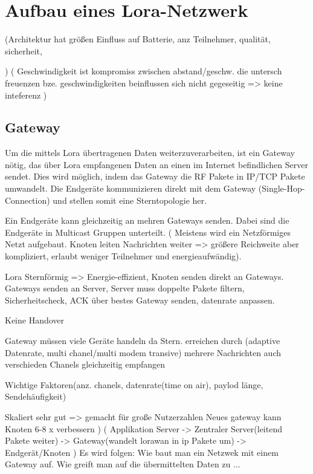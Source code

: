 \documentclass[a4paper,12pt]{article}
\begin{document}
    \section{Aufbau eines Lora-Netzwerk}
    \cite{WhatIsLoRa}(Architektur hat größen Einfluss auf Batterie, anz Teilnehmer, qualität, sicherheit,
    
    )
    \cite{LoRaSpec}(
        Geschwindigkeit ist kompromiss zwischen abstand/geschw. die untersch freuenzen bze. geschwindigkeiten beinflussen sich nicht gegeseitig => keine inteferenz
    )
    \subsection{Gateway}
    Um die mittels Lora übertragenen Daten weiterzuverarbeiten, ist ein Gateway nötig, das über Lora empfangenen Daten an einen im Internet befindlichen Server sendet. Dies wird möglich, indem das Gateway die RF Pakete in IP/TCP Pakete umwandelt.
    Die Endgeräte kommunizieren direkt mit dem Gateway (Single-Hop-Connection) und stellen somit eine Sterntopologie her.

    Ein Endgeräte kann gleichzeitig an mehren Gateways senden. Dabei sind die Endgeräte in Multicast Gruppen unterteilt.
        \cite{TheThing}
        \cite{WhatIsLoRa}(
            Meistens wird ein Netzförmiges Netzt aufgebaut. Knoten leiten Nachrichten weiter => größere Reichweite aber kompliziert, erlaubt weniger Teilnehmer und energieaufwändig). 

            Lora Sternförmig => Energie-effizient, Knoten senden direkt an Gateways. Gateways senden an Server, Server muss doppelte Pakete filtern, Sicherheitscheck, ACK über bestes Gateway senden, datenrate anpassen.

            Keine Handover

            Gateway müssen viele Geräte handeln da Stern. erreichen durch (adaptive Datenrate, multi chanel/multi modem transive) mehrere Nachrichten auch verschieden Chanels gleichzeitig empfangen

            Wichtige Faktoren(anz. chanels, datenrate(time on air), paylod länge, Sendehäufigkeit)
        
            Skaliert sehr gut => gemacht für große Nutzerzahlen
            Neues gateway kann Knoten 6-8 x verbessern
            )
        \cite{LoRaSpec}(
            Applikation Server -> Zentraler Server(leitend Pakete weiter) -> Gateway(wandelt lorawan in ip Pakete um) -> Endgerät/Knoten       )
        \cite{RFC8376}
    \newline{}\newline{} Es wird folgen: Wie baut man ein Netzwek mit einem Gateway auf. Wie greift man auf die übermittelten Daten zu ...
\end{document}
